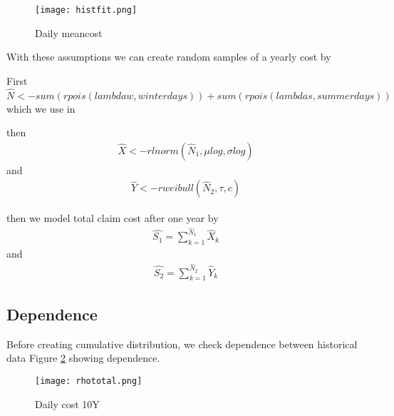 \documentclass[11pt]{article}
\begin{document}
 \begin{figure}[H]
 \center
  \texttt{[image: histfit.png]}
  \caption{Daily meancost}
  \label{fig:samplefig3}
\end{figure}

With these assumptions we can 
 create random samples of a yearly cost by

First $\hat{N} <-  sum(rpois(lambdaw,winterdays)) +  sum(rpois(lambdas,summerdays))$
which we use in

then
\begin{align*} 
	\hat{X} <- rlnorm(\hat{N}_1,\mu log,\sigma log) 
\end{align*}
and
\begin{align*} 
	 \hat{Y} <- rweibull(\hat{N}_2,\tau,c)
\end{align*}


then we model total claim cost after one year by
\begin{align} \label{eq:sum1}
	\hat{S_1} = \sum_{k=1}^{\hat{N}_1} \hat{ X}_k   
\end{align}
and
\begin{align} \label{eq:sum2}
	 \hat{S_2} = \sum_{k=1}^{\hat{N}_2} \hat{Y}_k
\end{align}


\subsection*{Dependence}
Before creating cumulative distribution, we check dependence between historical data
 Figure \ref{fig:samplefig4} showing dependence.


 \begin{figure}[H]
 \center
  \texttt{[image: rhototal.png]}
  \caption{Daily cost 10Y}
  \label{fig:samplefig4}
\end{figure}


\end{document}
